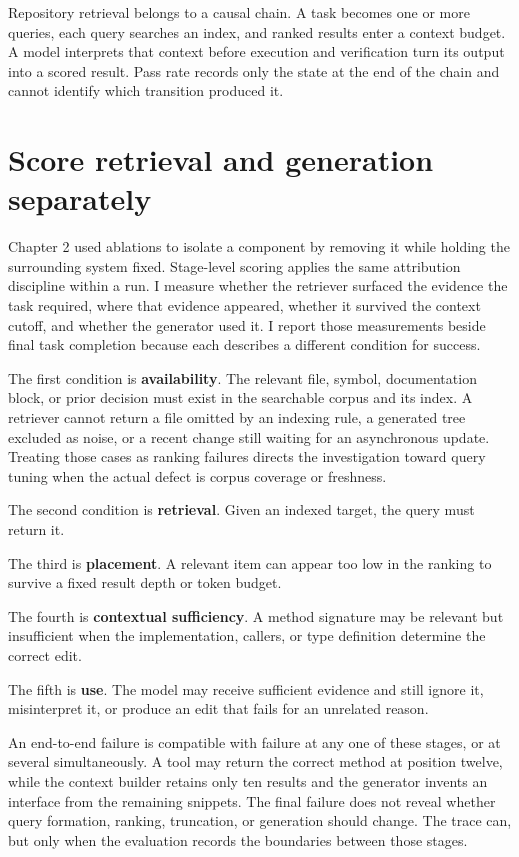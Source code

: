 Repository retrieval belongs to a causal chain. A task becomes one or more queries, each query searches an index, and ranked results enter a context budget. A model interprets that context before execution and verification turn its output into a scored result. Pass rate records only the state at the end of the chain and cannot identify which transition produced it.

\section{Score retrieval and generation separately}\label{score-retrieval-and-generation-separately}

Chapter 2 used ablations to isolate a component by removing it while holding the surrounding system fixed. Stage-level scoring applies the same attribution discipline within a run. I measure whether the retriever surfaced the evidence the task required, where that evidence appeared, whether it survived the context cutoff, and whether the generator used it. I report those measurements beside final task completion because each describes a different condition for success.

The first condition is \textbf{availability}. The relevant file, symbol, documentation block, or prior decision must exist in the searchable corpus and its index. A retriever cannot return a file omitted by an indexing rule, a generated tree excluded as noise, or a recent change still waiting for an asynchronous update. Treating those cases as ranking failures directs the investigation toward query tuning when the actual defect is corpus coverage or freshness.

The second condition is \textbf{retrieval}. Given an indexed target, the query must return it.

The third is \textbf{placement}. A relevant item can appear too low in the ranking to survive a fixed result depth or token budget.

The fourth is \textbf{contextual sufficiency}. A method signature may be relevant but insufficient when the implementation, callers, or type definition determine the correct edit.

The fifth is \textbf{use}. The model may receive sufficient evidence and still ignore it, misinterpret it, or produce an edit that fails for an unrelated reason.

An end-to-end failure is compatible with failure at any one of these stages, or at several simultaneously. A tool may return the correct method at position twelve, while the context builder retains only ten results and the generator invents an interface from the remaining snippets. The final failure does not reveal whether query formation, ranking, truncation, or generation should change. The trace can, but only when the evaluation records the boundaries between those stages.

